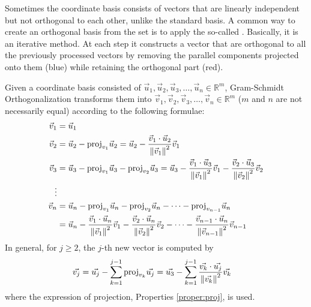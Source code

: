 Sometimes the coordinate basis consists of vectors that are linearly independent but not orthogonal to each other, unlike the standard basis. A common way to create an orthogonal basis from the set is to apply the so-called . Basically, it is an iterative method. At each step it constructs a vector that are orthogonal to all the previously processed vectors by removing the parallel components projected onto them (blue) while retaining the orthogonal part (red).
\begin{center}
\end{center}
\begin{defn}
\label{defn:GSorth}
Given a coordinate basis consisted of $\vec{u}_1, \vec{u}_2, \vec{u}_3, \ldots, \vec{u}_n \in \mathbb{R}^m$, Gram-Schmidt Orthogonalization transforms them into $\vec{v}_1, \vec{v}_2, \vec{v}_3, \ldots, \vec{v}_n \in \mathbb{R}^m$ ($m$ and $n$ are not necessarily equal) according to the following formulae:
\begin{align*}
\vec{v}_1 &= \vec{u}_1 \\
\vec{v}_2 &= \vec{u}_2 - \text{proj}_{v_1}\vec{u}_2 = \vec{u}_2 - \frac{\vec{v}_1 \cdot \vec{u}_2}{\norm{\vec{v}_1}^2} \vec{v}_1 \\
\vec{v}_3 &= \vec{u}_3 - \text{proj}_{v_1}\vec{u}_3 - \text{proj}_{v_2}\vec{u}_3 = \vec{u}_3 - \frac{\vec{v}_1 \cdot \vec{u}_3}{\norm{\vec{v}_1}^2} \vec{v}_1 - \frac{\vec{v}_2 \cdot \vec{u}_3}{\norm{\vec{v}_2}^2} \vec{v}_2 \\
\vdots \\
\vec{v}_n &= \vec{u}_n - \text{proj}_{v_1}\vec{u}_n - \text{proj}_{v_2}\vec{u}_n - \cdots - \text{proj}_{v_{n-1}}\vec{u}_n \\
&= \vec{u}_n - \frac{\vec{v}_1 \cdot \vec{u}_n}{\norm{\vec{v}_1}^2} \vec{v}_1 - \frac{\vec{v}_2 \cdot \vec{u}_n}{\norm{\vec{v}_2}^2} \vec{v}_2 - \cdots - \frac{\vec{v}_{n-1} \cdot \vec{u}_n}{\norm{\vec{v}_{n-1}}^2} \vec{v}_{n-1}
\end{align*}
In general, for $j \geq 2$, the $j$-th new vector is computed by
\begin{align*}
\vec{v_j} &= \vec{u_j} - \sum_{k=1}^{j-1}\text{proj}_{v_k}\vec{u_j}  = \vec{u_3} - \sum_{k=1}^{j-1}\frac{\vec{v_k} \cdot \vec{u_j}}{\norm{\vec{v_k}}^2} \vec{v_k}
\end{align*}
where the expression of projection, Properties \ref{proper:proj}, is used.
\end{defn}
